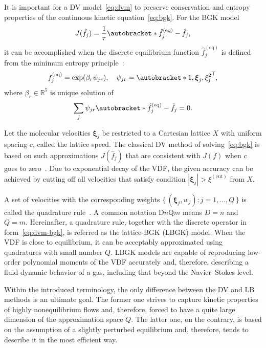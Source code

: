 \documentclass[]{elsarticle} %
\newcommand{\Set}[2]{\{\,{#1}:{#2}\,\}}
\newcommand{\transpose}[1]{#1^\mathsf{T}}
\DeclarePairedDelimiter\autobracket()       %
\newcommand{\br}[1]{\autobracket*{#1}}
\newcommand{\bxi}{\boldsymbol{\xi}}
\newcommand{\bxia}{\bxi_j}
\newcommand{\equil}[1]{#1^\mathrm{(eq)}}
\begin{document}
{%
It is important for a DV model~\eqref{eq:dvm} to preserve conservation and entropy properties
of the continuous kinetic equation~\eqref{eq:bgk}.
For the BGK model
\begin{equation}\label{eq:dvm-bgk}
    J(\hat{f}_j) = \frac1\tau\br{\equil{\hat{f}}_j-\hat{f}_j},
\end{equation}
it can be accomplished when the discrete equilibrium function \(\equil{\hat{f}}_j\)
is defined from the minimum entropy principle~\cite{Mieussens2000}:
\begin{equation}\label{eq:equilibrium-bgk}
   \equil{f}_j = \exp(\beta_r\psi_{j r}), \quad
   \psi_{j r} = \transpose{\br{1,\bxia, \xi_j^2}},
\end{equation}
where \(\beta_r\in\mathbb{R}^5\) is unique solution of
\begin{equation}\label{eq:beta}
   \sum_j\psi_{j r}\br{\equil{\hat{f}}_j - \hat{f}_j} = 0.
\end{equation}

Let the molecular velocities \(\bxi_j \) be restricted to a Cartesian lattice \(X\)
with uniform spacing \(c\), called the lattice speed.
The classical DV method of solving~\eqref{eq:bgk} is based on such approximations \(J(\hat{f}_j)\)
that are consistent with \(J(f)\) when \(c\) goes to zero~\cite{Aristov2001}.
Due to exponential decay of the VDF, the given accuracy can be achieved
by cutting off all velocities that satisfy condition \(|\bxi_j| > \xi^{(\mathrm{cut})}\) from \(X\).

A set of velocities with the corresponding weights \(\Set{(\bxi_j,w_j)}{j=1,\dots,Q}\)
is called the quadrature rule~\cite{Stroud1971}.
A common notation D\(n\)Q\(m\) means \(D=n\) and \(Q=m\).
Hereinafter, a quadrature rule, together with the discrete operator in form~\eqref{eq:dvm-bgk},
is referred as the lattice-BGK (LBGK) model.
When the VDF is close to equilibrium, it can be acceptably approximated using quadratures with small number \(Q\).
LBGK models are capable of reproducing low-order polynomial moments of the VDF accurately and,
therefore, describing a fluid-dynamic behavior of a gas, including that beyond the Navier--Stokes level.

Within the introduced terminology, the only difference between the DV and LB methods is an ultimate goal.
The former one strives to capture kinetic properties of highly nonequilibrium flows and, therefore,
forced to have a quite large dimension of the approximation space \(Q\).
The latter one, on the contrary, is based on the assumption of a slightly perturbed equilibrium and, therefore,
tends to describe it in the most efficient way.

}
\end{document}
